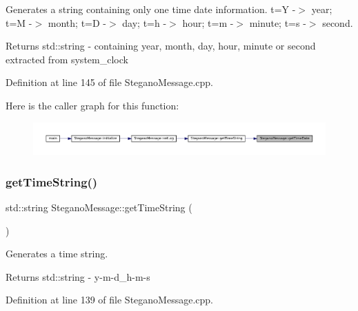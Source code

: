 Generates a string containing only one time date information. t=Y -\/$>$ year; t=M -\/$>$ month; t=D -\/$>$ day; t=h -\/$>$ hour; t=m -\/$>$ minute; t=s -\/$>$ second. 

\begin{DoxyReturn}{Returns}
std\+::string -\/ containing year, month, day, hour, minute or second extracted from system\+\_\+clock 
\end{DoxyReturn}


Definition at line 145 of file Stegano\+Message.\+cpp.

Here is the caller graph for this function\+:
\nopagebreak
\begin{figure}[H]
\begin{center}
\leavevmode
\includegraphics[width=350pt]{classSteganoMessage_a9aaa5e476220c95e1a68b4d722de43b1_icgraph}
\end{center}
\end{figure}
\mbox{\label{classSteganoMessage_a9771a4abc2d7a5a2a8cfb1684f7f313f}} 
\subsubsection{\texorpdfstring{getTimeString()}{getTimeString()}}
{\footnotesize\ttfamily std\+::string Stegano\+Message\+::get\+Time\+String (\begin{DoxyParamCaption}{ }\end{DoxyParamCaption})\hspace{0.3cm}{\ttfamily [static]}}



Generates a time string. 

\begin{DoxyReturn}{Returns}
std\+::string -\/ y-\/m-\/d\+\_\+h-\/m-\/s 
\end{DoxyReturn}


Definition at line 139 of file Stegano\+Message.\+cpp.

